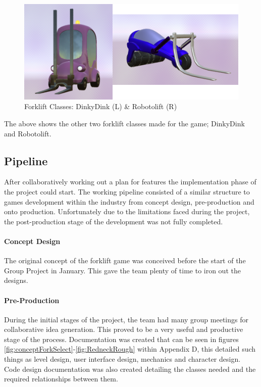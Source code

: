 \documentclass[12pt]{article}
\begin{document}
\begin{figure}[H]
	\caption{Forklift Classes: DinkyDink (L) \& Robotolift (R)}
	\includegraphics[width=\textwidth]{images/dinkyRobo}
\end{figure}
The above shows the other two forklift classes made for the game; DinkyDink and Robotolift. 


\subsection{Pipeline}

After collaboratively working out a plan for features the implementation phase of the project could start. The working pipeline consisted of a similar structure to games development within the industry from concept design, pre-production and onto production. Unfortunately due to the limitations faced during the project, the post-production stage of the development was not fully completed.

\paragraph{Concept Design}

The original concept of the forklift game was conceived before the start of the Group Project in January. This gave the team plenty of time to iron out the designs.

\paragraph{Pre-Production}

During the initial stages of the project, the team had many group meetings for collaborative idea generation. This proved to be a very useful and productive stage of the process. Documentation was created that can be seen in figures \ref{fig:conceptForkSelect}-\ref{fig:RedneckRough} within Appendix D, this detailed such things as level design, user interface design, mechanics and character design. Code design documentation was also created detailing the classes needed and the required relationships between them.
\end{document}
